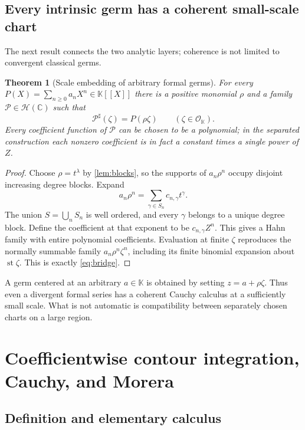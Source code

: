 \documentclass[11pt,letterpaper]{article}
\numberwithin{equation}{section}
\newtheorem{theorem}{Theorem}[section]
\theoremstyle{definition}
\theoremstyle{remark}
\newcommand{\K}{\mathbb K}
\newcommand{\C}{\mathbb C}
\newcommand{\OO}{\mathcal O}
\newcommand{\HH}{\mathscr H}
\DeclareMathOperator{\st}{st}
\begin{document}
\subsection{Every intrinsic germ has a coherent small-scale chart}

The next result connects the two analytic layers; coherence is not limited
to convergent classical germs.

\begin{theorem}[Scale embedding of arbitrary formal germs]\label{thm:bridge}
For every $P(X)=\sum_{n\ge0}a_nX^n\in\K[[X]]$ there is a positive
monomial $\rho$ and a family $\mathcal P\in\HH(\C)$ such that
\begin{equation}\label{eq:bridge}
 \mathcal P^\sharp(\zeta)=P(\rho\zeta)
 \qquad(\zeta\in\OO_\K).
\end{equation}
Every coefficient function of $\mathcal P$ can be chosen to be a
polynomial; in the separated construction each nonzero coefficient is
in fact a constant times a single power of $Z$.
\end{theorem}
\begin{proof}
Choose $\rho=t^\lambda$ by \cref{lem:blocks}, so the supports of
$a_n\rho^n$ occupy disjoint increasing degree blocks. Expand
\[
 a_n\rho^n=\sum_{\gamma\in S_n}c_{n,\gamma}t^\gamma.
\]
The union $S=\bigcup_nS_n$ is well ordered, and every $\gamma$ belongs
to a unique degree block. Define the coefficient at that exponent to be
$c_{n,\gamma}Z^n$. This gives a Hahn family with entire polynomial
coefficients. Evaluation at finite $\zeta$ reproduces the normally
summable family $a_n\rho^n\zeta^n$, including its finite binomial
expansion about $\st\zeta$. This is exactly \eqref{eq:bridge}.
\end{proof}

A germ centered at an arbitrary $a\in\K$ is obtained by setting
$z=a+\rho\zeta$. Thus even a divergent formal series has a coherent
Cauchy calculus at a sufficiently small scale. What is not automatic is
compatibility between separately chosen charts on a large region.

\section{Coefficientwise contour integration, Cauchy, and Morera}
\label{sec:cauchy}

\subsection{Definition and elementary calculus}
\end{document}
